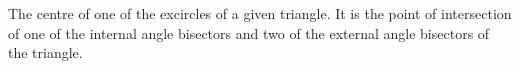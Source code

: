 The centre of one of the excircles of a given triangle. It is the
point of intersection of one of the internal angle bisectors
and two of the external angle bisectors of the triangle.